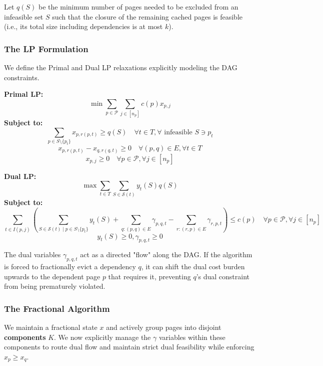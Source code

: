 \documentclass[a4paper]{article}
\begin{document}
Let $q(S)$ be the minimum number of pages needed to be excluded from an infeasible set $S$ such that the closure of the remaining cached pages is feasible (i.e., its total size including dependencies is at most $k$).

\subsubsection{The LP Formulation}
We define the Primal and Dual LP relaxations explicitly modeling the DAG constraints.

\noindent\textbf{Primal LP:}
$$ \min \sum_{p \in \mathcal{P}} \sum_{j \in [n_p]} c(p) x_{p,j} $$
\textbf{Subject to:}
$$ \sum_{p \in S \setminus \{p_t\}} x_{p,r(p,t)} \ge q(S) \quad \forall t \in T, \forall \text{ infeasible } S \ni p_t $$
$$ x_{p,r(p,t)} - x_{q,r(q,t)} \ge 0 \quad \forall (p,q) \in E, \forall t \in T $$
$$ x_{p,j} \ge 0 \quad \forall p \in \mathcal{P}, \forall j \in [n_p] $$

\noindent\textbf{Dual LP:}
$$ \max \sum_{t \in T} \sum_{S \in \mathcal{S}(t)} y_t(S) q(S) $$
\textbf{Subject to:}
$$ \sum_{t \in I(p,j)} \left( \sum_{S \in \mathcal{S}(t) \mid p \in S \setminus \{p_t\}} y_t(S) + \sum_{q: (p,q) \in E} \gamma_{p,q,t} - \sum_{r: (r,p) \in E} \gamma_{r,p,t} \right) \le c(p) \quad \forall p \in \mathcal{P}, \forall j \in [n_p] $$
$$ y_t(S) \ge 0, \gamma_{p,q,t} \ge 0 $$

The dual variables $\gamma_{p,q,t}$ act as a directed "flow" along the DAG. If the algorithm is forced to fractionally evict a dependency $q$, it can shift the dual cost burden upwards to the dependent page $p$ that requires it, preventing $q$'s dual constraint from being prematurely violated.

\subsubsection{The Fractional Algorithm}
We maintain a fractional state $x$ and actively group pages into disjoint \textbf{components} $K$. We now explicitly manage the $\gamma$ variables within these components to route dual flow and maintain strict dual feasibility while enforcing $x_p \ge x_q$.
\end{document}
